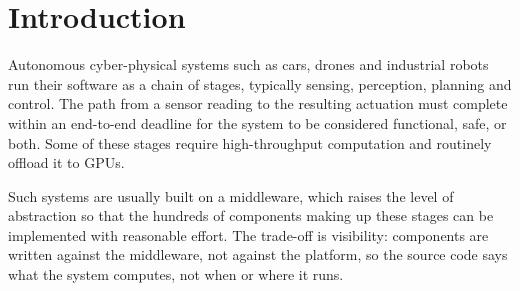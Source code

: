 
\begin{abstract}
Scheduling decisions in a ROS~2 application are spread over three parties that do
not see one another: the OS, the executor and the GPU run-time. This dispersion
of scheduling decisions makes end-to-end timing analysis hard, and for large
systems practically out of reach. Existing task models consider only the
OS--executor interplay and overlook the GPU. Moreover, a systematic approach to
build models where the three are covered at once is missing. FISH provides one: it
derives the model from a traced run of an unmodified application, as a single
hierarchical graph in which every vertex and edge is observed rather than assumed.
We report the model FISH extracts from Autoware---241 nodes, 7986 vertices and
6179 interactions---and what the instrumentation producing it costs: 8.7\,\% of
end-to-end latency, 10.6\,\% with GPU profiling on top, and no fault reported by
Autoware's own supervision.
\end{abstract}

\section{Introduction}
\label{sec:intro}

Autonomous cyber-physical systems such as cars, drones and industrial robots
run their software as a chain of stages, typically sensing, perception,
planning and control. The path from a sensor reading to the resulting actuation
must complete within an end-to-end deadline for the system to be considered
functional, safe, or both. Some of these stages require high-throughput
computation and routinely offload it to GPUs.

Such systems are usually built on a middleware, which raises the level of
abstraction so that the hundreds of components making up these stages can be
implemented with reasonable effort. The trade-off is visibility: components are
written against the middleware, not against the platform, so the source code
says what the system computes, not when or where it runs.

